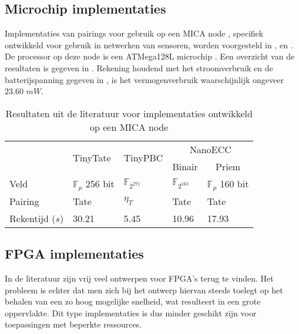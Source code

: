 \subsection{Microchip implementaties}

Implementaties van pairings voor gebruik op een MICA node \cite{mica}, specifiek ontwikkeld voor gebruik in netwerken van sensoren, worden voorgesteld in \cite{tinytate}, \cite{tinypbc} en \cite{nanoecc}. De processor op deze node is een ATMega128L microchip \cite{atmega}. Een overzicht van de resultaten is gegeven in . Rekening houdend met het stroomverbruik en de batterijspanning gegeven in \cite{nanoecc}, is het vermogenverbruik waarschijnlijk ongeveer $23.60$ $mW$.

\begin{table}[h]
	\caption[Resultaten uit de literatuur voor implementaties ontwikkeld op een MICA node]{Resultaten uit de literatuur voor implementaties ontwikkeld op een MICA node \cite{mica}}
	\label{tabel-resultaten-sensor}

	\centering
	\begin{tabular}{lllll}
		\toprule
		& \multirow{2}{*}{TinyTate \cite{tinytate}}	& \multirow{2}{*}{TinyPBC \cite{tinypbc}} &	\multicolumn{2}{c}{NanoECC \cite{nanoecc}}\\
		\cmidrule{4-5}
		& & & \multicolumn{1}{c}{Binair} & \multicolumn{1}{c}{Priem}\\
			\midrule
		Veld					& $\mathbb{F}_{p}$ 256 bit	& $\mathbb{F}_{2^{271}}$	& $\mathbb{F}_{2^{163}}$	& $\mathbb{F}_{p}$ 160 bit\\
		Pairing				& Tate							& $\eta_T$ 						& Tate							& Tate\\
		Rekentijd ($s$)	& 30.21							& 5.45							& 10.96							& 17.93\\
		\bottomrule
	\end{tabular}
\end{table}

\subsection{FPGA implementaties}

In de literatuur zijn vrij veel ontwerpen voor FPGA's terug te vinden. Het probleem is echter dat men zich bij het ontwerp hiervan steeds toelegt op het behalen van een zo hoog mogelijke snelheid, wat resulteert in een grote oppervlakte. Dit type implementaties is dus minder geschikt zijn voor toepassingen met beperkte ressources.

